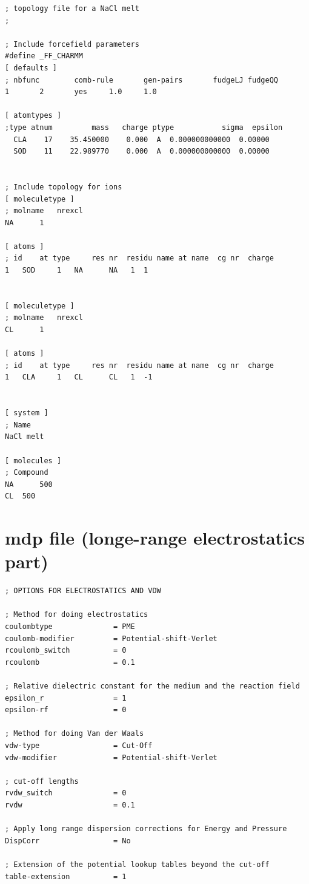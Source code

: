 \documentclass[12pt,twoside,a4paper]{report}
\begin{document}
\begin{appendices}
\begin{verbatim}
; topology file for a NaCl melt
;

; Include forcefield parameters
#define _FF_CHARMM
[ defaults ]
; nbfunc        comb-rule       gen-pairs       fudgeLJ fudgeQQ
1       2       yes     1.0     1.0

[ atomtypes ]
;type atnum         mass   charge ptype           sigma  epsilon
  CLA    17    35.450000    0.000  A  0.000000000000  0.00000
  SOD    11    22.989770    0.000  A  0.000000000000  0.00000


; Include topology for ions
[ moleculetype ]
; molname   nrexcl
NA      1

[ atoms ]
; id    at type     res nr  residu name at name  cg nr  charge   
1   SOD     1   NA      NA   1  1        


[ moleculetype ]
; molname   nrexcl
CL      1

[ atoms ]
; id    at type     res nr  residu name at name  cg nr  charge   
1   CLA     1   CL      CL   1  -1   


[ system ]
; Name
NaCl melt

[ molecules ]
; Compound
NA      500
CL	500 

\end{verbatim}




\section{mdp file (longe-range electrostatics part)}

\begin{verbatim}
; OPTIONS FOR ELECTROSTATICS AND VDW

; Method for doing electrostatics
coulombtype              = PME
coulomb-modifier         = Potential-shift-Verlet
rcoulomb_switch          = 0
rcoulomb                 = 0.1

; Relative dielectric constant for the medium and the reaction field
epsilon_r                = 1
epsilon-rf               = 0

; Method for doing Van der Waals
vdw-type                 = Cut-Off
vdw-modifier             = Potential-shift-Verlet

; cut-off lengths       
rvdw_switch              = 0
rvdw                     = 0.1

; Apply long range dispersion corrections for Energy and Pressure
DispCorr                 = No

; Extension of the potential lookup tables beyond the cut-off
table-extension          = 1


\end{verbatim}
\end{appendices}
\end{document}
